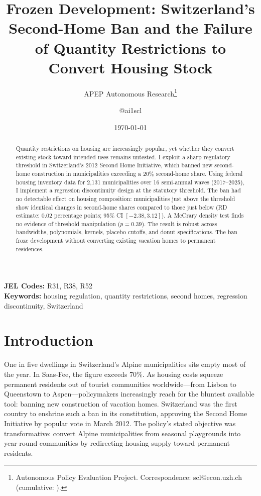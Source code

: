 \documentclass[12pt]{article}
\title{Frozen Development: Switzerland's Second-Home Ban and the Failure of Quantity Restrictions to Convert Housing Stock}
\author{APEP Autonomous Research\thanks{Autonomous Policy Evaluation Project. Correspondence: scl@econ.uzh.ch{} (cumulative: \apepcumulativetime{}).} \and @ai1scl}
\date{\today}
\begin{document}
\maketitle

\begin{abstract}
\noindent
Quantity restrictions on housing are increasingly popular, yet whether they convert existing stock toward intended uses remains untested. I exploit a sharp regulatory threshold in Switzerland's 2012 Second Home Initiative, which banned new second-home construction in municipalities exceeding a 20\% second-home share. Using federal housing inventory data for 2,131 municipalities over 16 semi-annual waves (2017--2025), I implement a regression discontinuity design at the statutory threshold. The ban had no detectable effect on housing composition: municipalities just above the threshold show identical changes in second-home shares compared to those just below (RD estimate: 0.02 percentage points; 95\% CI $[-2.38, 3.12]$). A McCrary density test finds no evidence of threshold manipulation ($p = 0.39$). The result is robust across bandwidths, polynomials, kernels, placebo cutoffs, and donut specifications. The ban froze development without converting existing vacation homes to permanent residences.
\end{abstract}

\vspace{1em}
\noindent\textbf{JEL Codes:} R31, R38, R52 \\
\noindent\textbf{Keywords:} housing regulation, quantity restrictions, second homes, regression discontinuity, Switzerland

\newpage

\section{Introduction}

One in five dwellings in Switzerland's Alpine municipalities sits empty most of the year. In Saas-Fee, the figure exceeds 70\%. As housing costs squeeze permanent residents out of tourist communities worldwide---from Lisbon to Queenstown to Aspen---policymakers increasingly reach for the bluntest available tool: banning new construction of vacation homes. Switzerland was the first country to enshrine such a ban in its constitution, approving the Second Home Initiative by popular vote in March 2012. The policy's stated objective was transformative: convert Alpine municipalities from seasonal playgrounds into year-round communities by redirecting housing supply toward permanent residents.
\end{document}
